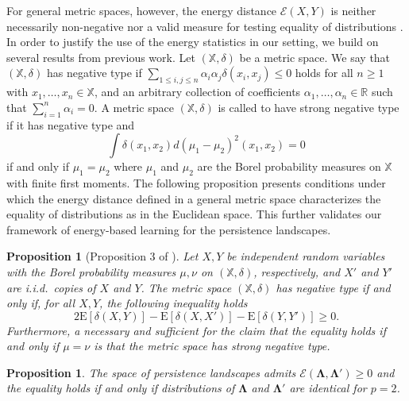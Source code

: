 \documentclass[12pt]{article}
\newtheorem{proposition}[theorem]{Proposition}
\newcommand{\bbR}{\mathbb{R}}
\newcommand{\bbX}{\mathbb{X}}
\newcommand{\bfLambda}{\mathbf{\Lambda}}
\begin{document}
For general metric spaces, however, the energy distance $\mathcal{E}(X,Y)$ is neither necessarily non-negative nor a valid measure for testing equality of distributions \citep{klebanov_n-distances_2006}. In order to justify the use of the energy statistics in our setting, we build on several results from previous work. Let $(\bbX,\delta)$ be a metric space. We say that $(\bbX,\delta)$ has negative type if $\sum_{1 \leq i,j\leq n} \alpha_i \alpha_j \delta(x_i, x_j) \leq 0$
holds for all $n\geq 1$ with $x_1,\ldots,x_n \in \bbX$, and an arbitrary collection of coefficients $\alpha_1,\ldots,\alpha_n \in \bbR$ such that $\sum_{i=1}^n \alpha_i = 0$. A metric space $(\bbX, \delta)$ is called to have strong negative type if it has negative type and 
\begin{equation*}
\int \delta(x_1,x_2) d(\mu_1 - \mu_2)^2 (x_1,x_2) = 0
\end{equation*}
if and only if $\mu_1 = \mu_2$ where $\mu_1$ and $\mu_2$ are the Borel probability measures on $\bbX$ with finite first moments. The following proposition presents conditions under which the energy distance defined in a general metric space characterizes the equality of distributions as in the Euclidean space. This further validates our framework of energy-based learning for the persistence landscapes.

\begin{proposition}[Proposition 3 of \cite{szekely_energy_2017}]\label{prop:energy}
	Let $X,Y$ be independent random variables with the Borel probability measures $\mu,\nu$ on $(\bbX, \delta)$, respectively, and $X'$ and $Y'$ are i.i.d.~copies of $X$ and $Y$. The metric space $(\bbX, \delta)$ has negative type if and only if, for all $X, Y$, the following inequality holds
	\begin{equation*}
	2\mathrm{E} [\delta(X,Y)] - \mathrm{E} [\delta(X,X')] - \mathrm{E}[\delta(Y,Y')] \geq 0.
	\end{equation*}
	Furthermore, a necessary and sufficient for the claim that the equality holds if and only if $\mu=\nu$ is that the metric space has strong negative type.
\end{proposition}

\begin{proposition}\label{prop:energy_in_Hilbert}
	The space of persistence landscapes admits $\mathcal{E}(\mathbf{\Lambda}, \bfLambda') \geq 0$ and the equality holds if and only if distributions of $\bfLambda$ and $\bfLambda'$ are identical for $p=2$. 
\end{proposition}
\end{document}
